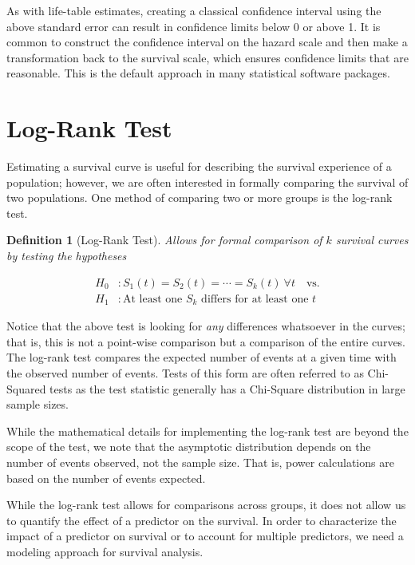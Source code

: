 \documentclass[
]{book}
\theoremstyle{plain}
\theoremstyle{mydefn}
\newtheorem{definition}{Definition}[chapter]
\theoremstyle{myexmpl}
\theoremstyle{remark}
\begin{document}
As with life-table estimates, creating a classical confidence interval using the above standard error can result in confidence limits below 0 or above 1. It is common to construct the confidence interval on the hazard scale and then make a transformation back to the survival scale, which ensures confidence limits that are reasonable. This is the default approach in many statistical software packages.

\hypertarget{log-rank-test}{%
\section{Log-Rank Test}\label{log-rank-test}}

Estimating a survival curve is useful for describing the survival experience of a population; however, we are often interested in formally comparing the survival of two populations. One method of comparing two or more groups is the log-rank test.

\begin{definition}[Log-Rank Test]
Allows for formal comparison of \(k\) survival curves by testing the hypotheses

\[
\begin{aligned}
  H_0&: S_1(t) = S_2(t) = \dotsb = S_k(t) \ \forall t \quad \text{vs.} \\
  H_1&: \text{At least one } S_k \text{ differs for at least one } t
\end{aligned}
\]
\end{definition}

Notice that the above test is looking for \emph{any} differences whatsoever in the curves; that is, this is not a point-wise comparison but a comparison of the entire curves. The log-rank test compares the expected number of events at a given time with the observed number of events. Tests of this form are often referred to as Chi-Squared tests as the test statistic generally has a Chi-Square distribution in large sample sizes.

While the mathematical details for implementing the log-rank test are beyond the scope of the test, we note that the asymptotic distribution depends on the number of events observed, not the sample size. That is, power calculations are based on the number of events expected.

While the log-rank test allows for comparisons across groups, it does not allow us to quantify the effect of a predictor on the survival. In order to characterize the impact of a predictor on survival or to account for multiple predictors, we need a modeling approach for survival analysis.
\end{document}

